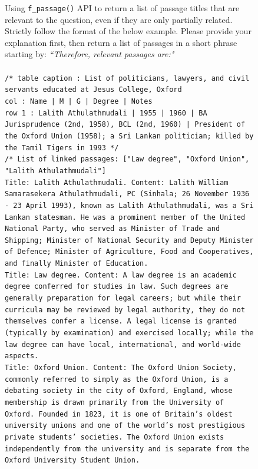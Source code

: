 \begin{figure}[htb]

\begin{tcolorbox}
[title = Passage Verification, colback = gray!10, colframe = black, sharp corners, boxrule=0.5mm]


Using \texttt{f\_passage()} API to return a list of passage titles that are relevant to the question, even if they are only partially related. 
Strictly follow the format of the below example. Please provide your explanation first, then return a list of passages in a short phrase starting by: \textit{``Therefore, relevant passages are:"}
 \\
  \\
\texttt{/* 
table caption : List of politicians, lawyers, and civil servants educated at Jesus College, Oxford \\
col : Name | M | G | Degree | Notes \\
row 1 : Lalith Athulathmudali | 1955 | 1960 | BA Jurisprudence (2nd, 1958), BCL (2nd, 1960) | President of the Oxford Union (1958); a Sri Lankan politician; killed by the Tamil Tigers in 1993 
*/}
 \\
\texttt{/* 
List of linked passages: ["Law degree", "Oxford Union", "Lalith Athulathmudali"] \\
Title: Lalith Athulathmudali. Content: Lalith William Samarasekera Athulathmudali, PC (Sinhala; 26 November 1936 - 23 April 1993), known as Lalith Athulathmudali, was a Sri Lankan statesman. He was a prominent member of the United National Party, who served as Minister of Trade and Shipping; Minister of National Security and Deputy Minister of Defence; Minister of Agriculture, Food and Cooperatives, and finally Minister of Education. \\
Title: Law degree. Content: A law degree is an academic degree conferred for studies in law. Such degrees are generally preparation for legal careers; but while their curricula may be reviewed by legal authority, they do not themselves confer a license. A legal license is granted (typically by examination) and exercised locally; while the law degree can have local, international, and world-wide aspects. \\
Title: Oxford Union. Content: The Oxford Union Society, commonly referred to simply as the Oxford Union, is a debating society in the city of Oxford, England, whose membership is drawn primarily from the University of Oxford. Founded in 1823, it is one of Britain’s oldest university unions and one of the world’s most prestigious private students' societies. The Oxford Union exists independently from the university and is separate from the Oxford University Student Union.
}
\end{tcolorbox}
\end{figure}
